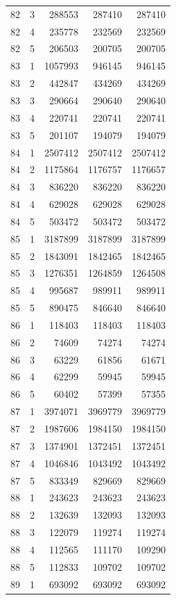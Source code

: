 \begin{longtable}{rrrrr}
82 & 3 & 288553 & 287410 & 287410 \\
82 & 4 & 235778 & 232569 & 232569 \\
82 & 5 & 206503 & 200705 & 200705 \\
83 & 1 & 1057993 & 946145 & 946145 \\
83 & 2 & 442847 & 434269 & 434269 \\
83 & 3 & 290664 & 290640 & 290640 \\
83 & 4 & 220741 & 220741 & 220741 \\
83 & 5 & 201107 & 194079 & 194079 \\
84 & 1 & 2507412 & 2507412 & 2507412 \\
84 & 2 & 1175864 & 1176757 & 1176657 \\
84 & 3 & 836220 & 836220 & 836220 \\
84 & 4 & 629028 & 629028 & 629028 \\
84 & 5 & 503472 & 503472 & 503472 \\
85 & 1 & 3187899 & 3187899 & 3187899 \\
85 & 2 & 1843091 & 1842465 & 1842465 \\
85 & 3 & 1276351 & 1264859 & 1264508 \\
85 & 4 & 995687 & 989911 & 989911 \\
85 & 5 & 890475 & 846640 & 846640 \\
86 & 1 & 118403 & 118403 & 118403 \\
86 & 2 & 74609 & 74274 & 74274 \\
86 & 3 & 63229 & 61856 & 61671 \\
86 & 4 & 62299 & 59945 & 59945 \\
86 & 5 & 60402 & 57399 & 57355 \\
87 & 1 & 3974071 & 3969779 & 3969779 \\
87 & 2 & 1987606 & 1984150 & 1984150 \\
87 & 3 & 1374901 & 1372451 & 1372451 \\
87 & 4 & 1046846 & 1043492 & 1043492 \\
87 & 5 & 833349 & 829669 & 829669 \\
88 & 1 & 243623 & 243623 & 243623 \\
88 & 2 & 132639 & 132093 & 132093 \\
88 & 3 & 122079 & 119274 & 119274 \\
88 & 4 & 112565 & 111170 & 109290 \\
88 & 5 & 112833 & 109702 & 109702 \\
89 & 1 & 693092 & 693092 & 693092 \\

\end{longtable}
